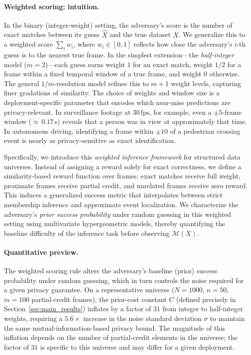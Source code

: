 \documentclass[letterpaper]{article} %
\begin{document}
\paragraph{Weighted scoring: intuition.}
In the binary (integer-weight) setting, the adversary's score is the number of exact matches between its guess $\hat{X}$ and the true dataset $X$. We generalize this to a weighted score $\sum_i w_i$, where $w_i \in [0,1]$ reflects how close the adversary's $i$-th guess is to the nearest true frame. In the simplest extension---the \emph{half-integer} model ($m{=}2$)---each guess earns weight $1$ for an exact match, weight $1/2$ for a frame within a fixed temporal window of a true frame, and weight $0$ otherwise. The general $1/m$-resolution model refines this to $m+1$ weight levels, capturing finer gradations of similarity. The choice of weights and window size is a deployment-specific parameter that encodes which near-miss predictions are privacy-relevant. In surveillance footage at 30\,fps, for example, even a $\pm 5$-frame window (${\approx}\,0.17$\,s) reveals that a person was in view at approximately that time. In autonomous driving, identifying a frame within $\pm 10$ of a pedestrian crossing event is nearly as privacy-sensitive as exact identification.

Specifically, we introduce this \emph{weighted inference framework} for structured data universes. Instead of assigning a reward solely for exact correctness, we define a similarity-based reward function over frames: exact matches receive full weight, proximate frames receive partial credit, and unrelated frames receive zero reward. This induces a generalized success metric that interpolates between strict membership inference and approximate event localization. We characterize the adversary's \emph{prior success probability} under random guessing in this weighted setting using multivariate hypergeometric models, thereby quantifying the baseline difficulty of the inference task before observing $\mathcal{M}(X)$.

\paragraph{Quantitative preview.}
The weighted scoring rule alters the adversary's baseline (prior) success probability under random guessing, which in turn controls the noise required for a given privacy guarantee. On a representative universe ($N{=}1000$, $n{=}50$, $m{=}100$ partial-credit frames), the prior-cost constant $C$ (defined precisely in Section~\ref{sec:main_results}) inflates by a factor of $31$ from integer to half-integer weights, requiring a $5.6{\times}$ increase in the noise standard deviation $\sigma$ to maintain the same mutual-information-based privacy bound. The magnitude of this inflation depends on the number of partial-credit elements in the universe; the factor of $31$ is specific to this universe and may differ for a given deployment.
\end{document}
